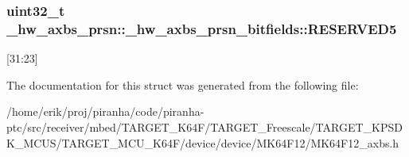 \subsubsection[{\texorpdfstring{R\+E\+S\+E\+R\+V\+E\+D5}{RESERVED5}}]{\setlength{\rightskip}{0pt plus 5cm}uint32\+\_\+t \+\_\+hw\+\_\+axbs\+\_\+prsn\+::\+\_\+hw\+\_\+axbs\+\_\+prsn\+\_\+bitfields\+::\+R\+E\+S\+E\+R\+V\+E\+D5}\hypertarget{struct__hw__axbs__prsn_1_1__hw__axbs__prsn__bitfields_a2ce4cb168267d14659355648a2528219}{}\label{struct__hw__axbs__prsn_1_1__hw__axbs__prsn__bitfields_a2ce4cb168267d14659355648a2528219}
\mbox{[}31\+:23\mbox{]} 

The documentation for this struct was generated from the following file\+:\begin{DoxyCompactItemize}
\item 
/home/erik/proj/piranha/code/piranha-\/ptc/src/receiver/mbed/\+T\+A\+R\+G\+E\+T\+\_\+\+K64\+F/\+T\+A\+R\+G\+E\+T\+\_\+\+Freescale/\+T\+A\+R\+G\+E\+T\+\_\+\+K\+P\+S\+D\+K\+\_\+\+M\+C\+U\+S/\+T\+A\+R\+G\+E\+T\+\_\+\+M\+C\+U\+\_\+\+K64\+F/device/device/\+M\+K64\+F12/M\+K64\+F12\+\_\+axbs.\+h\end{DoxyCompactItemize}
